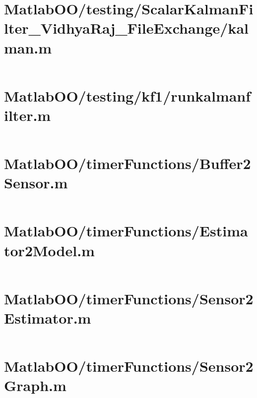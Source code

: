 \pagebreak
\section*{MatlabOO/testing/ScalarKalmanFilter\_VidhyaRaj\_FileExchange/kalman.m}\label{code:MatlabOO/testing/ScalarKalmanFilter_VidhyaRaj_FileExchange/kalman.m}
\inputminted[linenos,fontsize=\scriptsize]{matlab}{/home/dcouture/git/mathyourlife/TSatPy/beta_versions/matlab_object_oriented/testing/ScalarKalmanFilter_VidhyaRaj_FileExchange/kalman.m}

\pagebreak
\section*{MatlabOO/testing/kf1/runkalmanfilter.m}\label{code:MatlabOO/testing/kf1/runkalmanfilter.m}
\inputminted[linenos,fontsize=\scriptsize]{matlab}{/home/dcouture/git/mathyourlife/TSatPy/beta_versions/matlab_object_oriented/testing/kf1/runkalmanfilter.m}

\pagebreak
\section*{MatlabOO/timerFunctions/Buffer2Sensor.m}\label{code:MatlabOO/timerFunctions/Buffer2Sensor.m}
\inputminted[linenos,fontsize=\scriptsize]{matlab}{/home/dcouture/git/mathyourlife/TSatPy/beta_versions/matlab_object_oriented/timerFunctions/Buffer2Sensor.m}

\pagebreak
\section*{MatlabOO/timerFunctions/Estimator2Model.m}\label{code:MatlabOO/timerFunctions/Estimator2Model.m}
\inputminted[linenos,fontsize=\scriptsize]{matlab}{/home/dcouture/git/mathyourlife/TSatPy/beta_versions/matlab_object_oriented/timerFunctions/Estimator2Model.m}

\pagebreak
\section*{MatlabOO/timerFunctions/Sensor2Estimator.m}\label{code:MatlabOO/timerFunctions/Sensor2Estimator.m}
\inputminted[linenos,fontsize=\scriptsize]{matlab}{/home/dcouture/git/mathyourlife/TSatPy/beta_versions/matlab_object_oriented/timerFunctions/Sensor2Estimator.m}

\pagebreak
\section*{MatlabOO/timerFunctions/Sensor2Graph.m}\label{code:MatlabOO/timerFunctions/Sensor2Graph.m}
\inputminted[linenos,fontsize=\scriptsize]{matlab}{/home/dcouture/git/mathyourlife/TSatPy/beta_versions/matlab_object_oriented/timerFunctions/Sensor2Graph.m}

